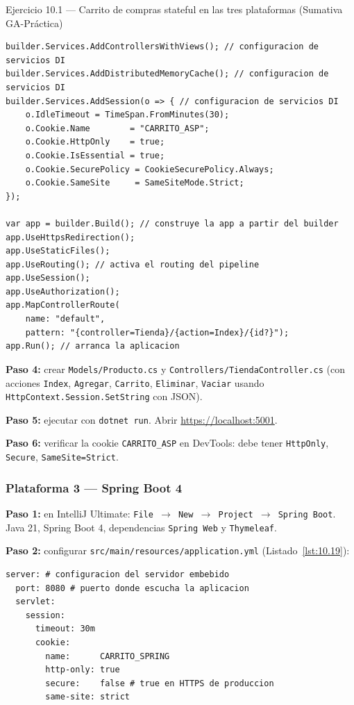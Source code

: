 \begin{cajaejercicio}{Ejercicio 10.1 --- Carrito de compras stateful en las tres plataformas (Sumativa GA-Práctica)}
\begin{lstlisting}[style=cs,caption={Program.cs},label=lst:10.18]
builder.Services.AddControllersWithViews(); // configuracion de servicios DI
builder.Services.AddDistributedMemoryCache(); // configuracion de servicios DI
builder.Services.AddSession(o => { // configuracion de servicios DI
    o.IdleTimeout = TimeSpan.FromMinutes(30);
    o.Cookie.Name        = "CARRITO_ASP";
    o.Cookie.HttpOnly    = true;
    o.Cookie.IsEssential = true;
    o.Cookie.SecurePolicy = CookieSecurePolicy.Always;
    o.Cookie.SameSite     = SameSiteMode.Strict;
});

var app = builder.Build(); // construye la app a partir del builder
app.UseHttpsRedirection();
app.UseStaticFiles();
app.UseRouting(); // activa el routing del pipeline
app.UseSession();
app.UseAuthorization();
app.MapControllerRoute(
    name: "default",
    pattern: "{controller=Tienda}/{action=Index}/{id?}");
app.Run(); // arranca la aplicacion
\end{lstlisting}

\textbf{Paso 4:} crear \texttt{Models/Producto.cs} y
\texttt{Controllers/TiendaController.cs} (con acciones
\texttt{Index}, \texttt{Agregar}, \texttt{Carrito},
\texttt{Eliminar}, \texttt{Vaciar} usando
\texttt{HttpContext.Session.SetString} con JSON).

\textbf{Paso 5:} ejecutar con \texttt{dotnet run}. Abrir
\url{https://localhost:5001}.

\textbf{Paso 6:} verificar la cookie \texttt{CARRITO\_ASP} en
DevTools: debe tener \texttt{HttpOnly}, \texttt{Secure},
\texttt{SameSite=Strict}.

\subsubsection*{Plataforma 3 --- Spring Boot 4}

\textbf{Paso 1:} en IntelliJ Ultimate:
\texttt{File $\rightarrow$ New $\rightarrow$ Project $\rightarrow$ Spring Boot}.
Java 21, Spring Boot 4, dependencias \texttt{Spring Web} y
\texttt{Thymeleaf}.

\textbf{Paso 2:} configurar \texttt{src/main/resources/application.yml} (Listado~\ref{lst:10.19}):

\begin{lstlisting}[style=yaml,caption={application.yml},label=lst:10.19]
server: # configuracion del servidor embebido
  port: 8080 # puerto donde escucha la aplicacion
  servlet:
    session:
      timeout: 30m
      cookie:
        name:      CARRITO_SPRING
        http-only: true
        secure:    false # true en HTTPS de produccion
        same-site: strict
\end{lstlisting}


\end{cajaejercicio}
